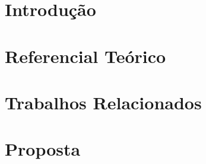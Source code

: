 \documentclass[qualificacao,mestrado]{packages/icmc}
\begin{document}
\textual

\chapter{Introdução}
\label{chapter:introducao}


\chapter{Referencial Teórico}
\label{chapter:referencial-teorico}


\chapter{Trabalhos Relacionados}
\label{chapter:trabalhos-relacionados}


\chapter{Proposta}
\label{chapter:proposta}



% 

\postextual


\end{document}
